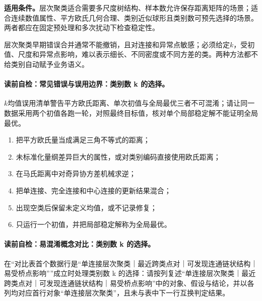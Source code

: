 \begin{applicabilitybox}
\textbf{适用条件。}层次聚类适合需要多尺度树结构、样本数允许保存距离矩阵的场景；\kMeans{}适合连续数值属性、平方欧氏几何合理、类别近似球形且类别数可预先选择的场景。两者都应在固定预处理和多次扰动下检查稳定性。
\end{applicabilitybox}

\label{struct:V4-C02-CH29}
\begin{notapplicablebox}[title=\SLMethodLimitationsTitle]
层次聚类早期错误合并通常不能撤销，且对连接和异常点敏感；\kMeans{}必须给定$k$，受初值、尺度和异常点影响，难以表示细长、不同密度或不同方差的类。两种方法都不给类别自动赋予业务语义。
\end{notapplicablebox}

\label{struct:V4-C02-CH30}
\paragraph{读前自检：常见错误与误用边界：类别数 k 的选择。}$k$均值误用清单警告平方欧氏距离、单次初值与全局最优三者不可混淆；请让同一数据采用两个初值各跑一轮，对照最终目标值，核对单个局部稳定解不能证明全局最优。\par

\begin{warningbox}
\begin{enumerate}[leftmargin=2.2em]
  \item 把平方欧氏量当成满足三角不等式的距离；
  \item 未标准化量纲差异巨大的属性，或对类别编码直接使用欧氏距离；
  \item 在马氏距离中对奇异协方差机械求逆；
  \item 把单连接、完全连接和中心连接的更新结果混合；
  \item \kMeans{}出现空类后保留未定义均值，或不记录修复；
  \item 只运行一个初值，并把局部稳定解称为全局最优。
\end{enumerate}
\end{warningbox}

\label{struct:V4-C02-CH31}
\paragraph{读前自检：易混淆概念对比：类别数 k 的选择。}在“对比表首个数据行是“单连接层次聚类｜最近跨类点对｜可发现连通链状结构｜易受桥点影响””成立时处理类别数 k 的选择：请按列复述“单连接层次聚类｜最近跨类点对｜可发现连通链状结构｜易受桥点影响”中的对象、假设与结论，并以各列均对应首行对象“单连接层次聚类”，且未与表中下一行互换判定结果。\par

